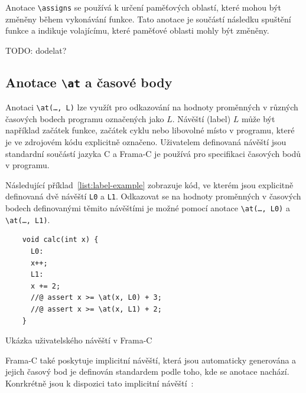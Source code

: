 Anotace \texttt{\textbackslash assigns} se používá k určení paměťových oblastí,
které mohou být změněny během vykonávání funkce.
Tato anotace je součástí následku spuštění funkce
a indikuje volajícímu, které paměťové oblasti mohly být změněny.

TODO: dodelat?

\subsection{Anotace \texttt{\textbackslash at} a časové body}
\label{subsec:acsl-anotace-at-a-casove-body}


Anotaci \texttt{\textbackslash at(\dots, L)} lze využít pro odkazování na hodnoty proměnných
v různých časových bodech programu označených jako $L$.
Návěští (label) $L$ může být například začátek funkce, začátek cyklu nebo libovolné místo v programu,
které je ve zdrojovém kódu explicitně označeno.
Uživatelem definovaná návěští jsou standardní součástí jazyka C
a Frama\mbox{-}C je používá pro specifikaci časových bodů v programu.

Následující příklad~\ref{list:label-example} zobrazuje kód,
ve kterém jsou explicitně definovaná dvě návěští \texttt{L0} a \texttt{L1}.
Odkazovat se na hodnoty proměnných v časových bodech definovanými těmito návěštími
je možné pomocí anotace \texttt{\textbackslash at(\dots, L0)} a \texttt{\textbackslash at(\dots, L1)}.

\begin{listing}[H]
    \begin{verbatim}
    void calc(int x) {
      L0:
      x++;
      L1:
      x += 2;
      //@ assert x >= \at(x, L0) + 3;
      //@ assert x >= \at(x, L1) + 2;
    }
    \end{verbatim}
    \caption{Ukázka uživatelského návěští v Frama-C}
    \label{list:label-example}
\end{listing}

Frama\mbox{-}C také poskytuje implicitní návěští,
která jsou automaticky generována a jejich časový bod je definován
standardem podle toho, kde se anotace nachází.
Konrkrétně jsou k dispozici tato implicitní návěští~\cite{ACSLSpec}:

